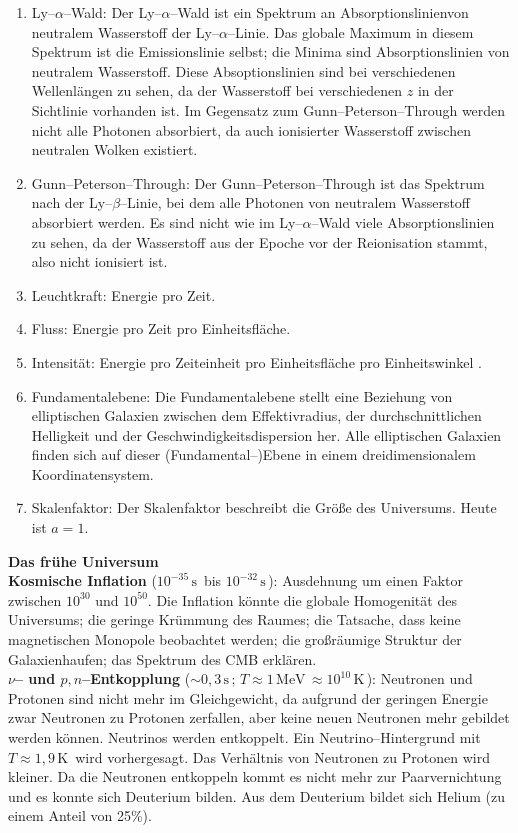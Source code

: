 \documentclass[a4paper,12pt]{article}
\numberwithin{equation}{section}
\begin{document}
\begin{enumerate}[label=$\circ$]
        \item Ly--$\alpha $--Wald: Der Ly--$\alpha $--Wald ist ein Spektrum an Absorptionslinienvon neutralem Wasserstoff der Ly--$\alpha $--Linie. Das globale Maximum in diesem Spektrum ist die Emissionslinie selbst; die Minima sind Absorptionslinien von neutralem Wasserstoff. Diese Absoptionslinien sind bei verschiedenen Wellenlängen zu sehen, da der Wasserstoff bei verschiedenen $z$ in der Sichtlinie vorhanden ist. Im Gegensatz zum Gunn--Peterson--Through werden nicht alle Photonen absorbiert, da auch ionisierter Wasserstoff zwischen neutralen Wolken existiert.
        \item Gunn--Peterson--Through: Der Gunn--Peterson--Through ist das Spektrum nach der Ly--$\beta $--Linie, bei dem alle Photonen von neutralem Wasserstoff absorbiert werden. Es sind nicht wie im Ly--$\alpha $--Wald viele Absorptionslinien zu sehen, da der Wasserstoff aus der Epoche vor der Reionisation stammt, also nicht ionisiert ist.
        \item Leuchtkraft: Energie pro Zeit.
        \item Fluss: Energie pro Zeit pro Einheitsfläche.
        \item Intensität: Energie pro Zeiteinheit pro Einheitsfläche pro Einheitswinkel .
        \item Fundamentalebene: Die Fundamentalebene stellt eine Beziehung von elliptischen Galaxien zwischen dem Effektivradius, der durchschnittlichen Helligkeit und der Geschwindigkeitsdispersion her. Alle elliptischen Galaxien finden sich auf dieser (Fundamental--)Ebene in einem dreidimensionalem Koordinatensystem.
        \item Skalenfaktor: Der Skalenfaktor beschreibt die Größe des Universums. Heute ist $a=1$.
\end{enumerate}
\textbf{Das frühe Universum}\\
\textbf{Kosmische Inflation} ($10^{-35}\,\text{s}\,$ bis $10^{-32}\,\text{s}\,$): Ausdehnung um einen Faktor zwischen $10^{30}$ und $10^{50}$. Die Inflation könnte die globale Homogenität des Universums; die geringe Krümmung des Raumes; die Tatsache, dass keine magnetischen Monopole beobachtet werden; die großräumige Struktur der Galaxienhaufen; das Spektrum des CMB erklären.\\
\textbf{$\nu $-- und $p,n$--Entkopplung} ($\sim 0,3\,\text{s}\,$; $T\approx 1\,\text{MeV}\,\approx 10^{10}\,\text{K}\,$): Neutronen und Protonen sind nicht mehr im Gleichgewicht, da aufgrund der geringen Energie zwar Neutronen zu Protonen zerfallen, aber keine neuen Neutronen mehr gebildet werden können. Neutrinos werden entkoppelt. Ein Neutrino--Hintergrund mit $T\approx 1,9\,\text{K}\,$ wird vorhergesagt. Das Verhältnis von Neutronen zu Protonen wird kleiner. Da die Neutronen entkoppeln kommt es nicht mehr zur Paarvernichtung und es konnte sich Deuterium bilden. Aus dem Deuterium bildet sich Helium (zu einem Anteil von 25\%).\\
\end{document}
